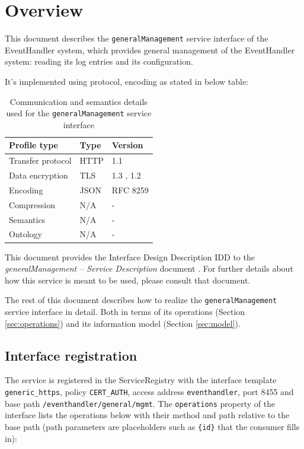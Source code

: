 \documentclass[a4paper]{arrowhead}
\begin{document}
\section{Overview}
\label{sec:overview}

This document describes the \texttt{generalManagement} service interface of the EventHandler system, which provides general management of the EventHandler system: reading its log entries and its configuration.

It's implemented using protocol, encoding as stated in below table:
\begin{table}[ht!]
  \centering
  \begin{tabular}{|l|l|l|}
    \hline
    \rowcolor{gray!33} Profile type & Type & Version \\ \hline
    Transfer protocol & HTTP & 1.1 \cite{rfc9112} \\ \hline
    Data encryption & TLS & 1.3 \cite{rfc8446}, 1.2 \cite{rfc5246} \\ \hline
    Encoding & JSON & RFC 8259 \cite{rfc8259} \\ \hline
    Compression & N/A & - \\ \hline
    Semantics & N/A & - \\ \hline
    Ontology & N/A & - \\ \hline
  \end{tabular}
  \caption{Communication and semantics details used for the \texttt{generalManagement} service interface}
  \label{tab:comunication_semantics_profile}
\end{table}

This document provides the Interface Design Description IDD to the \textit{generalManagement -- Service Description} document \cite{eh-generalManagement-sd}.
For further details about how this service is meant to be used, please consult that document.

The rest of this document describes how to realize the \texttt{generalManagement} service
interface in detail. Both in terms of its operations (Section \ref{sec:operations}) and its information model (Section \ref{sec:model}).

\subsection{Interface registration}

The service is registered in the ServiceRegistry with the interface template \texttt{generic\_\allowbreak{}https}, policy \texttt{CERT\_\allowbreak{}AUTH}, access address \texttt{eventhandler}, port 8455 and base path \texttt{/\allowbreak{}eventhandler/\allowbreak{}general/\allowbreak{}mgmt}. The \texttt{operations} property of the interface lists the operations below with their method and path relative to the base path (path parameters are placeholders such as \texttt{\{id\}} that the consumer fills in):
\end{document}
